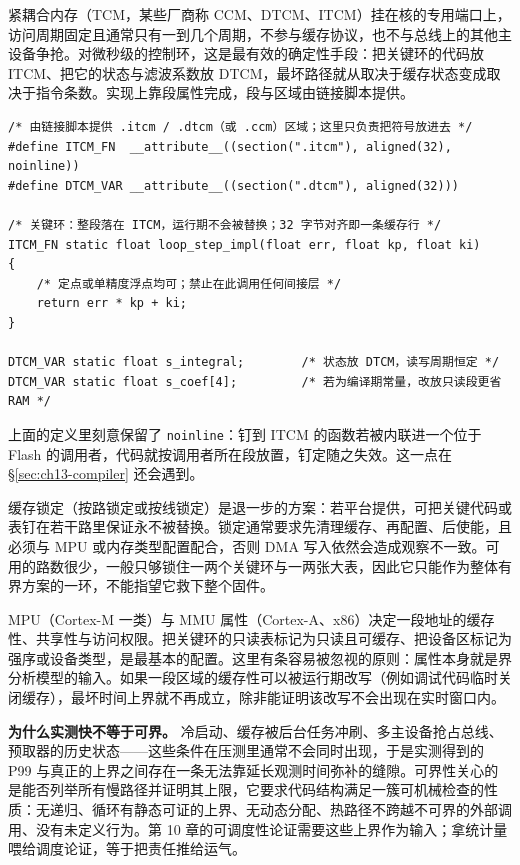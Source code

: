\documentclass[12pt,a4paper,fontset=fandol]{ctexbook}
\newcommand{\Tp}[1]{\texttt{#1}}
\begin{document}
紧耦合内存（TCM，某些厂商称 CCM、DTCM、ITCM）挂在核的专用端口上，访问周期固定且通常只有一到几个周期，不参与缓存协议，也不与总线上的其他主设备争抢。对微秒级的控制环，这是最有效的确定性手段：把关键环的代码放 ITCM、把它的状态与滤波系数放 DTCM，最坏路径就从取决于缓存状态变成取决于指令条数。实现上靠段属性完成，段与区域由链接脚本提供。

\begin{lstlisting}[style=cstyle,caption={C：把关键环代码与数据钉到 ITCM 与 DTCM，并显式对齐},label={lst:ch13-tcmsec}]
/* 由链接脚本提供 .itcm / .dtcm（或 .ccm）区域；这里只负责把符号放进去 */
#define ITCM_FN  __attribute__((section(".itcm"), aligned(32), noinline))
#define DTCM_VAR __attribute__((section(".dtcm"), aligned(32)))

/* 关键环：整段落在 ITCM，运行期不会被替换；32 字节对齐即一条缓存行 */
ITCM_FN static float loop_step_impl(float err, float kp, float ki)
{
    /* 定点或单精度浮点均可；禁止在此调用任何间接层 */
    return err * kp + ki;
}

DTCM_VAR static float s_integral;        /* 状态放 DTCM，读写周期恒定 */
DTCM_VAR static float s_coef[4];         /* 若为编译期常量，改放只读段更省 RAM */
\end{lstlisting}

上面的定义里刻意保留了 \Tp{noinline}：钉到 ITCM 的函数若被内联进一个位于 Flash 的调用者，代码就按调用者所在段放置，钉定随之失效。这一点在 \S\ref{sec:ch13-compiler} 还会遇到。

缓存锁定（按路锁定或按线锁定）是退一步的方案：若平台提供，可把关键代码或表钉在若干路里保证永不被替换。锁定通常要求先清理缓存、再配置、后使能，且必须与 MPU 或内存类型配置配合，否则 DMA 写入依然会造成观察不一致。可用的路数很少，一般只够锁住一两个关键环与一两张大表，因此它只能作为整体有界方案的一环，不能指望它救下整个固件。

MPU（Cortex-M 一类）与 MMU 属性（Cortex-A、x86）决定一段地址的缓存性、共享性与访问权限。把关键环的只读表标记为只读且可缓存、把设备区标记为强序或设备类型，是最基本的配置。这里有条容易被忽视的原则：属性本身就是界分析模型的输入。如果一段区域的缓存性可以被运行期改写（例如调试代码临时关闭缓存），最坏时间上界就不再成立，除非能证明该改写不会出现在实时窗口内。

{\bf 为什么实测快不等于可界。} 冷启动、缓存被后台任务冲刷、多主设备抢占总线、预取器的历史状态——这些条件在压测里通常不会同时出现，于是实测得到的 P99 与真正的上界之间存在一条无法靠延长观测时间弥补的缝隙。可界性关心的是能否列举所有慢路径并证明其上限，它要求代码结构满足一簇可机械检查的性质：无递归、循环有静态可证的上界、无动态分配、热路径不跨越不可界的外部调用、没有未定义行为。第 10 章的可调度性论证需要这些上界作为输入；拿统计量喂给调度论证，等于把责任推给运气。
\end{document}
